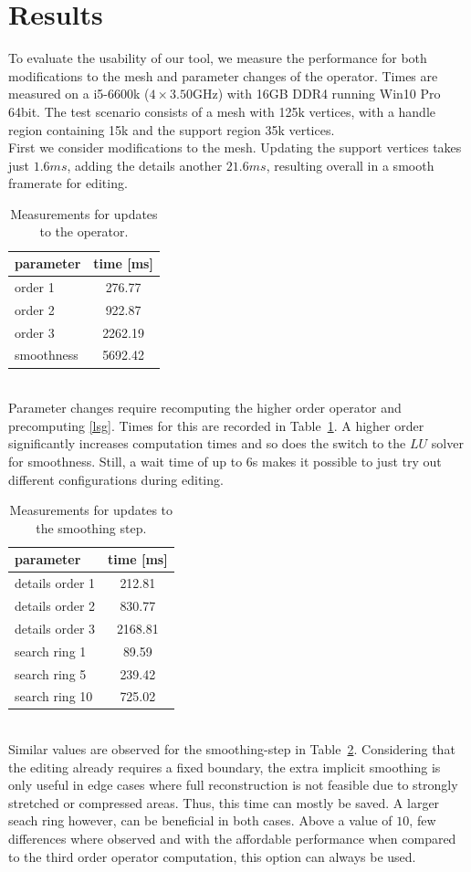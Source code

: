 \documentclass[twocolumn]{article}
\begin{document}
\section{Results}
To evaluate the usability of our tool, we measure the performance for both modifications to the mesh and parameter changes of the operator.
Times are measured on a i5-6600k ($4 \times 3.50$GHz) with 16GB DDR4 running Win10 Pro 64bit.
The test scenario consists of a mesh with 125k vertices, with a handle region containing 15k and the support region 35k vertices. \\
First we consider modifications to the mesh. Updating the support vertices takes just $1.6\si{ms}$, adding the details another $21.6\si{ms}$, resulting overall in a smooth framerate for editing.
\begin{table}
	\centering
	\caption{Measurements for updates to the operator.}
	\begin{tabular}{lc}
		parameter & time [ms] \\
		\hline
		order 1 & 276.77 \\
		order 2 & 922.87 \\
		order 3 & 2262.19 \\
		smoothness & 5692.42 \\
		\hline
	\end{tabular}
	\label{tab:order}
\end{table}\\
Parameter changes require recomputing the higher order operator and precomputing \eqref{lsg}. Times for this are recorded in Table~\ref{tab:order}. A higher order significantly increases computation times and so does the switch to the $LU$ solver for smoothness. Still, a wait time of up to 6s makes it possible to just try out different configurations during editing.
\begin{table}
	\centering
	\caption{Measurements for updates to the smoothing step.}
	\begin{tabular}{lc}
		parameter & time [ms] \\
		\hline
		details order 1 & 212.81 \\
		details order 2 & 830.77 \\
		details order 3 & 2168.81 \\
		search ring 1 & 89.59 \\
		search ring 5 & 239.42 \\
		search ring 10 & 725.02 \\
		\hline
	\end{tabular}
	\label{tab:smoothing}
\end{table}\\
Similar values are observed for the smoothing-step in Table~\ref{tab:smoothing}.
Considering that the editing already requires a fixed boundary, the extra implicit smoothing is only useful in edge cases where full reconstruction is not feasible due to strongly stretched or compressed areas. Thus, this time can mostly be saved. A larger seach ring however, can be beneficial in both cases. Above a value of $10$, few differences where observed and with the affordable performance when compared to the third order operator computation, this option can always be used.



\end{document}
